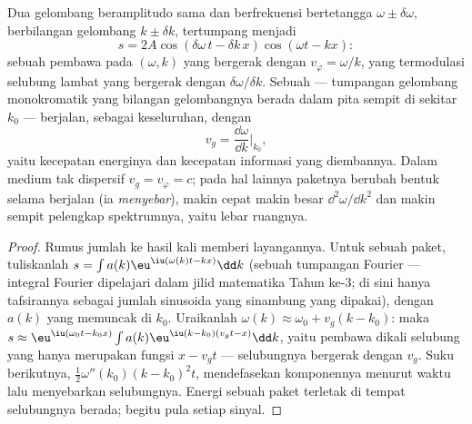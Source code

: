 \begin{proposition}\label{prop:b2:dispersion-wave-packets:group}
Dua gelombang beramplitudo sama dan berfrekuensi bertetangga $\omega \pm
\delta\omega$, berbilangan gelombang $k \pm \delta k$, tertumpang menjadi
\[
s = 2A\cos(\delta\omega\,t - \delta k\,x)\cos(\omega t - kx) :
\]
sebuah pembawa pada $(\omega, k)$ yang bergerak dengan $v_\varphi = \omega/k$, yang termodulasi selubung
lambat yang bergerak dengan $\delta\omega/\delta k$. Sebuah \emph{} ---
tumpangan gelombang monokromatik yang bilangan gelombangnya berada dalam pita sempit
di sekitar $k_0$ --- berjalan, sebagai keseluruhan, dengan \emph{}
\[
v_g = \frac{\dd\omega}{\dd k}\Bigr|_{k_0} ,
\]
yaitu kecepatan energinya dan kecepatan informasi yang diembannya.
Dalam medium tak dispersif $v_g = v_\varphi = c$; pada hal lainnya paketnya
berubah bentuk selama berjalan (ia \emph{menyebar}), makin cepat makin besar
$\dd^2\omega/\dd k^2$ dan makin sempit pelengkap spektrumnya, yaitu
lebar ruangnya.
\end{proposition}

\begin{proof}
Rumus jumlah ke hasil kali memberi layangannya. Untuk sebuah paket, tuliskanlah $s =
\int a(k)\eu^{\iu(\omega(k)t - kx)}\dd k$ (sebuah tumpangan Fourier ---
integral Fourier dipelajari dalam jilid matematika Tahun ke-3; di sini hanya
tafsirannya sebagai jumlah sinusoida yang sinambung yang dipakai), dengan
$a(k)$ yang memuncak di $k_0$. Uraikanlah $\omega(k) \approx \omega_0 + v_g(k - k_0)$: maka
$s \approx \eu^{\iu(\omega_0t - k_0x)}\int a(k)\eu^{\iu(k - k_0)(v_gt - x)}\dd k$, yaitu
pembawa dikali selubung yang hanya merupakan fungsi $x - v_gt$ ---
selubungnya bergerak dengan $v_g$. Suku berikutnya, $\tfrac12\omega''(k_0)(k - k_0)^2t$,
mendefasekan komponennya menurut waktu lalu menyebarkan selubungnya. Energi
sebuah paket terletak di tempat selubungnya berada; begitu pula setiap sinyal.
\end{proof}

